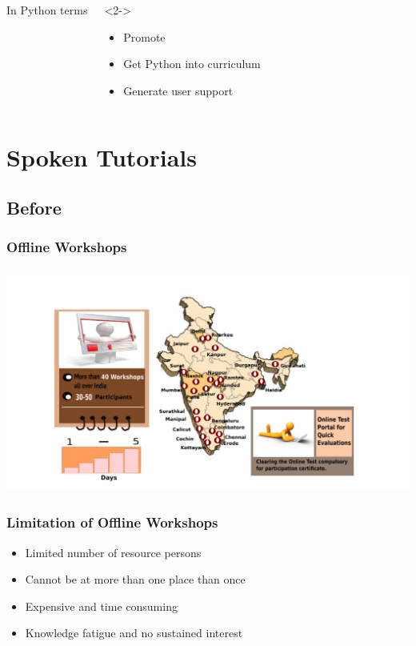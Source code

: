 \documentclass[compress,red]{beamer} %
\begin{document}
\begin{frame}
\begin{columns}
\begin{exampleblock}{}
In Python terms
\end{exampleblock}
\begin{exampleblock}<2->{}
\begin{itemize}
\item Promote 
\item Get Python into curriculum
\item Generate user support
\end{itemize}
\end{exampleblock}
\end{columns}
\end{frame}
\section{Spoken Tutorials}
\subsection{Before}
\begin{frame}
\frametitle{Offline Workshops}
\includegraphics[scale=.15]{workshop.png}
\end{frame}

\begin{frame}
\frametitle{Limitation of Offline Workshops}
\begin{itemize}
\item Limited number of resource persons
\item Cannot be at more than one place than once
\item Expensive and time consuming
\item Knowledge fatigue and no sustained interest
\end{itemize}
\end{frame}
\end{document}
